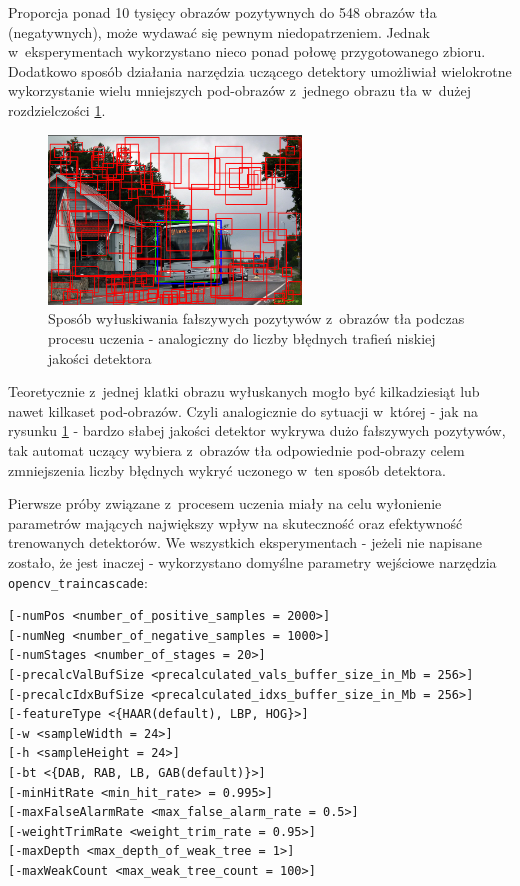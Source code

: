 Proporcja ponad 10 tysięcy obrazów pozytywnych do 548 obrazów tła (negatywnych), 
może wydawać się pewnym niedopatrzeniem. Jednak 
w~eksperymentach wykorzystano nieco ponad połowę przygotowanego zbioru. Dodatkowo
sposób działania narzędzia uczącego detektory umożliwiał wielokrotne 
wykorzystanie wielu mniejszych pod-obrazów z~jednego obrazu tła w~dużej
rozdzielczości \ref{fig:exp_false_positive_mechanism}.
 

\begin{figure}[!h]
	\centering
	\includegraphics[width=0.6\textwidth]{img/exp_false_positive_mechanism}
	\caption{Sposób wyłuskiwania fałszywych pozytywów z~obrazów tła podczas procesu
		uczenia - analogiczny do liczby błędnych trafień niskiej
		jakości detektora}
	\label{fig:exp_false_positive_mechanism}
\end{figure}

Teoretycznie z~jednej klatki obrazu wyłuskanych mogło być kilkadziesiąt lub
nawet kilkaset pod-obrazów. Czyli analogicznie do sytuacji w~której - jak 
na rysunku 
\ref{fig:exp_false_positive_mechanism}
- bardzo słabej jakości detektor wykrywa dużo fałszywych pozytywów, tak
automat uczący wybiera z~obrazów tła odpowiednie pod-obrazy celem
zmniejszenia liczby
błędnych wykryć uczonego w~ten sposób detektora.

Pierwsze próby związane z~procesem uczenia miały na celu 
wyłonienie parametrów mających największy wpływ na skuteczność 
oraz efektywność trenowanych detektorów.
We wszystkich eksperymentach - jeżeli nie napisane zostało, że
jest inaczej - wykorzystano domyślne parametry wejściowe narzędzia 
\verb|opencv_traincascade|:

\begin{lstlisting}
[-numPos <number_of_positive_samples = 2000>]
[-numNeg <number_of_negative_samples = 1000>]
[-numStages <number_of_stages = 20>]
[-precalcValBufSize <precalculated_vals_buffer_size_in_Mb = 256>]
[-precalcIdxBufSize <precalculated_idxs_buffer_size_in_Mb = 256>]
[-featureType <{HAAR(default), LBP, HOG}>]
[-w <sampleWidth = 24>]
[-h <sampleHeight = 24>]
[-bt <{DAB, RAB, LB, GAB(default)}>]
[-minHitRate <min_hit_rate> = 0.995>]
[-maxFalseAlarmRate <max_false_alarm_rate = 0.5>]
[-weightTrimRate <weight_trim_rate = 0.95>]
[-maxDepth <max_depth_of_weak_tree = 1>]
[-maxWeakCount <max_weak_tree_count = 100>]
\end{lstlisting}

